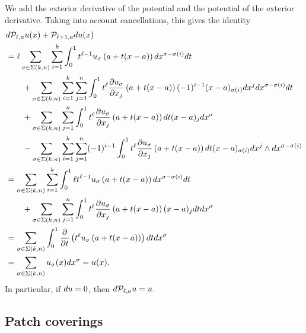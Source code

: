 \documentclass[10pt,a4paper]{article}
\begin{document}
We add the exterior derivative of the potential and the potential of the exterior derivative.
Taking into account cancellations, this gives the identity 
\begin{align*}
    &
    d {\mathcal P}_{\ell,a} u(x)
    +
    {\mathcal P}_{\ell+1,a} d u(x)
    \\&
    =
    \ell
    \sum_{\sigma \in \Sigma(k,n)} \sum_{i=1}^{k}
    \int_{0}^{1} 
    t^{\ell-1} u_{\sigma}\left(a+t(x-a)\right) dx^{\sigma-\sigma(i)} dt 
    \\&\qquad
    + 
    \sum_{\sigma \in \Sigma(k,n)} \sum_{i=1}^{k} \sum_{j=1}^{n}
    \int_{0}^{1} 
    t^{\ell} \frac{ \partial u_{\sigma} }{\partial x_{j}}\left(a+t(x-a)\right) (-1)^{i-1} (x-a)_{\sigma(i) } dx^{j} dx^{\sigma-\sigma(i)} dt 
    \\&\qquad
    +
    \sum_{\sigma \in \Sigma(k,n)} \sum_{j=1}^{n}
    \int_{0}^{1} t^{\ell} \frac{ \partial u_{\sigma} }{\partial x_{j}}\left(a+t(x-a)\right) dt (x-a)_{j}
    dx^{\sigma}
    \\&\qquad
    - 
    \sum_{\sigma \in \Sigma(k,n)} \sum_{i=1}^{k} \sum_{j=1}^{n}
    (-1)^{i-1}
    \int_{0}^{1} t^{\ell} \frac{ \partial u_{\sigma} }{\partial x_{j}}\left(a+t(x-a)\right) dt 
    (x-a)_{\sigma(i)} dx^{j} \wedge dx^{\sigma-\sigma(i)}
    \\&
    =
    \sum_{\sigma \in \Sigma(k,n)} \sum_{i=1}^{k}
    \int_{0}^{1} 
    \ell t^{\ell-1} u_{\sigma}\left(a+t(x-a)\right) dx^{\sigma-\sigma(i)} dt 
    \\&\qquad
    +
    \sum_{\sigma \in \Sigma(k,n)} \sum_{j=1}^{n}
    \int_{0}^{1} t^{\ell} \frac{ \partial u_{\sigma} }{\partial x_{j}}\left(a+t(x-a)\right) (x-a)_{j} dt
    dx^{\sigma}
    \\&
    =
    \sum_{\sigma \in \Sigma(k,n)} 
    \int_{0}^{1} \frac{\partial}{\partial t} \left( t^{\ell} u_{\sigma}\left(a+t(x-a)\right) \right) dt dx^{\sigma}
    \\&
    =
    \sum_{\sigma \in \Sigma(k,n)} 
    u_{\sigma}(x) dx^{\sigma}
    =
    u(x)
    .
\end{align*}
In particular, if $d u = 0$, then $d {\mathcal P}_{\ell,a} u = u$.






\subsection{Patch coverings}
\end{document}
